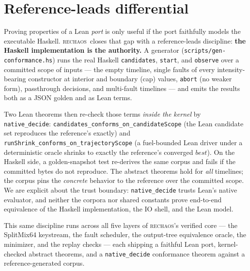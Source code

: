 \documentclass[10pt,twocolumn,letterpaper]{article}
\newcommand{\rc}{\textsc{rechaos}}
\newcommand{\tool}[1]{\texttt{#1}}
\begin{document}
\section{Reference-leads differential}\label{sec:differential}
Proving properties of a Lean \emph{port} is only useful if the port faithfully
models the executable Haskell. \rc\ closes that gap with a reference-leads
discipline: \textbf{the Haskell implementation is the authority.} A generator
(\texttt{scripts/gen-conformance.hs}) runs the real Haskell
\texttt{candidates}, \texttt{start}, and \texttt{observe} over a committed scope
of inputs --- the empty timeline, single faults of every intensity-bearing
constructor at interior and boundary (cap) values, \tool{abort} (no weaker form),
passthrough decisions, and multi-fault timelines --- and emits the results both
as a JSON golden and as Lean terms.

Two Lean theorems then re-check those terms \emph{inside the kernel} by
\texttt{native\_decide}: \texttt{candidates\_conforms\_on\_candidateScope}
(the Lean candidate set reproduces the reference's exactly) and
\texttt{runShrink\_conforms\_on\_trajectoryScope} (a fuel-bounded Lean driver
under a deterministic oracle shrinks to exactly the reference's converged
$\mathit{best}$). On the Haskell side, a golden-snapshot test re-derives the same
corpus and fails if the committed bytes do not reproduce. The abstract theorems
hold for \emph{all} timelines; the corpus pins the \emph{concrete} behavior to
the reference over the committed scope. We are explicit about the trust boundary:
\texttt{native\_decide} trusts Lean's native evaluator, and neither the corpora
nor shared constants prove end-to-end equivalence of the Haskell implementation,
the IO shell, and the Lean model.

This same discipline runs across all five layers of \rc's verified core --- the
SplitMix64 keystream, the fault scheduler, the output-tree equivalence oracle,
the minimizer, and the replay checks --- each shipping a faithful Lean port,
kernel-checked abstract theorems, and a \texttt{native\_decide} conformance
theorem against a reference-generated corpus.

\end{document}
